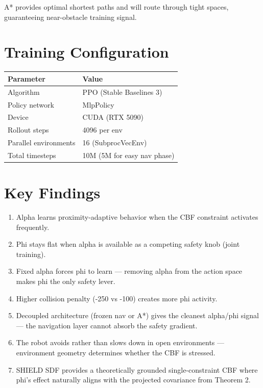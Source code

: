 \documentclass[11pt]{article}
\begin{document}
A* provides optimal shortest paths and will route through tight spaces, guaranteeing near-obstacle training signal.


\section*{Training Configuration}

\begin{tabular}{ll}
\toprule
Parameter & Value \\
\midrule
Algorithm & PPO (Stable Baselines 3) \\
Policy network & MlpPolicy \\
Device & CUDA (RTX 5090) \\
Rollout steps & 4096 per env \\
Parallel environments & 16 (SubprocVecEnv) \\
Total timesteps & 10M (5M for easy nav phase) \\
\bottomrule
\end{tabular}


\section*{Key Findings}

\begin{enumerate}
\item Alpha learns proximity-adaptive behavior when the CBF constraint activates frequently.
\item Phi stays flat when alpha is available as a competing safety knob (joint training).
\item Fixed alpha forces phi to learn --- removing alpha from the action space makes phi the only safety lever.
\item Higher collision penalty (-250 vs -100) creates more phi activity.
\item Decoupled architecture (frozen nav or A*) gives the cleanest alpha/phi signal --- the navigation layer cannot absorb the safety gradient.
\item The robot avoids rather than slows down in open environments --- environment geometry determines whether the CBF is stressed.
\item SHIELD SDF provides a theoretically grounded single-constraint CBF where phi's effect naturally aligns with the projected covariance from Theorem 2.
\end{enumerate}
\end{document}
